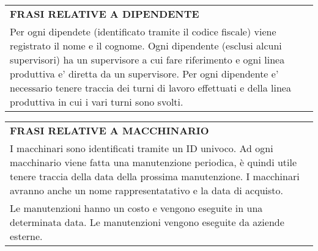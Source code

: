 \begin{center}
	\vspace{0.5cm}

	\begin{tabular}{P{16cm}}
		\toprule
		 \textbf {\large {FRASI RELATIVE A DIPENDENTE}}                                                                                                                                                                                                                                                                                                   \\
		Per ogni dipendete (identificato tramite il codice fiscale) viene registrato il nome e il cognome. Ogni dipendente (esclusi alcuni supervisori) ha un supervisore a cui fare riferimento e ogni linea produttiva e' diretta da un supervisore. Per ogni dipendente e' necessario tenere traccia dei turni di lavoro effettuati e della linea produttiva in cui i vari turni sono svolti. \\
		\bottomrule
	\end{tabular}

	\vspace{0.5cm}

	\begin{tabular}{P{16cm}}
		\toprule
		 \textbf {\large {FRASI RELATIVE A MACCHINARIO}}                                                                                                                                                                                    \\
		I macchinari sono identificati tramite un ID univoco. Ad ogni macchinario viene fatta una manutenzione periodica, è quindi utile tenere traccia della data della prossima manutenzione. I macchinari avranno anche un nome rappresentatativo e la data di acquisto. \\
		Le manutenzioni hanno un costo e vengono eseguite in una determinata data. Le manutenzioni vengono eseguite da aziende esterne.                                                                                                                                     \\
		\bottomrule
	\end{tabular}

\end{center}